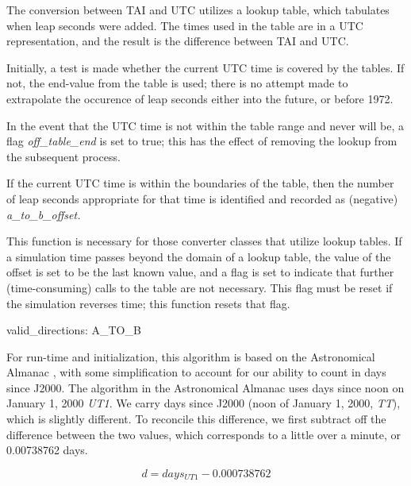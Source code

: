 {\begin{enumerate}
{\begin{enumerate}
The conversion between TAI and UTC utilizes a lookup table, which
tabulates when leap seconds were added.  The times used in the table
are in a UTC representation, and the result is the difference between
TAI and UTC.

Initially, a test is made whether the current UTC time is covered by the
tables.  If not, the end-value from the table is used; there is no attempt made
to extrapolate the occurence of leap seconds either into the future, or before
1972.

In the event that the UTC time is not within the table range and never will
be, a flag
\textit{off\_table\_end} is set to true; this has the effect of
removing the lookup from the subsequent process.

If the current UTC time is within the boundaries of the table, then the
number of leap seconds appropriate for that time is identified and
recorded as (negative) \textit{a\_to\_b\_offset.}

This function is necessary for those converter classes that utilize
lookup tables.  If a simulation time passes beyond the domain of a
lookup table, the value of the offset is set to be the last known
value, and a flag is set to indicate that further (time-consuming)
calls to the table are not necessary.  This flag must be reset if the
simulation reverses time; this function resets that flag.

\end{enumerate}}




{\begin{enumerate}
valid\_directions:
A\_TO\_B

For run-time and initialization, this algorithm is based on the
Astronomical Almanac \cite{timebib:AstronomicalAlmanac},
with some simplification to account for our
ability to count in days since J2000.  The algorithm in the
Astronomical Almanac uses days since noon on January 1, 2000
\textit{UT1}.  We carry days since J2000 (noon of January 1, 2000,
\textit{TT}), which is slightly different.  To reconcile this
difference, we first subtract off the difference between the two
values, which corresponds to a little over a minute, or 0.00738762
days.

\begin{equation*}
d=days_{UT1}-0.000738762
\end{equation*}


\end{enumerate}}
\end{enumerate}}
